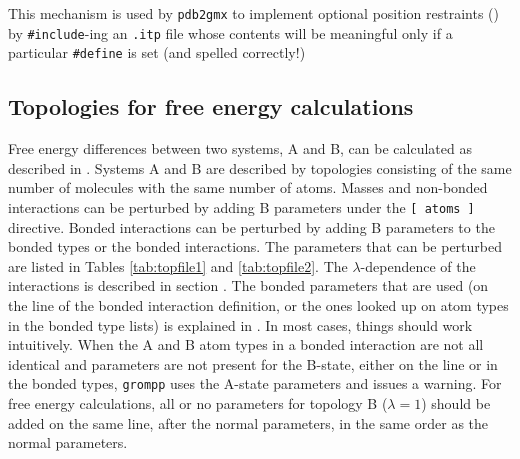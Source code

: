 This mechanism is used by {\tt pdb2gmx} to implement optional position
restraints () by {\tt \#include}-ing an {\tt .itp} file whose contents
will be meaningful only if a particular {\tt \#define} is set (and spelled
correctly!)

\subsection{Topologies for free energy calculations}
Free energy differences between two systems, A and B, can be calculated as
described in .
Systems A and B are described by topologies
consisting of the same number of molecules with the same number of
atoms. Masses and non-bonded interactions can be perturbed by adding B
parameters under the {\tt [~atoms~]} directive. Bonded interactions can be 
perturbed by adding B parameters to the bonded types or the bonded
interactions. The parameters that can be perturbed are listed in  
Tables \ref{tab:topfile1} and \ref{tab:topfile2}.
The $\lambda$-dependence of the interactions is described
in section .
The bonded parameters that are used (on the line of the bonded
interaction definition, or the ones looked up on atom types
in the bonded type lists) is explained in .
In most cases, things should work intuitively.
When the A and B atom types in a bonded interaction
are not all identical and parameters are not present for the B-state,
either on the line or in the bonded types,
{\tt grompp} uses the A-state parameters and issues a warning.
For free energy calculations, all or no parameters for topology B
($\lambda = 1$) should be added on the same line, after the normal
parameters, in the same order as the normal parameters.

